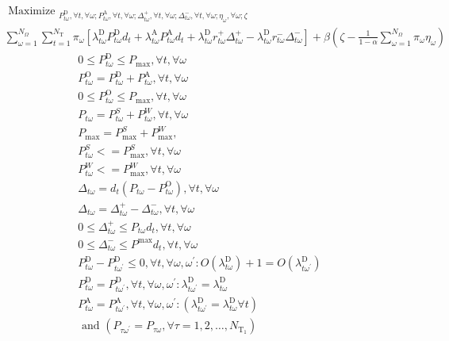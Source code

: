 \begin{equation*}
\begin{array}{c}
\text { Maximize }_{P_{t \omega}^{\mathrm{D}}, \forall t, \forall \omega ; P_{t \omega}^{\mathrm{A}}, \forall t, \forall \omega ; \Delta_{t \omega}^{+}, \forall t, \forall \omega ; \Delta_{t \omega}^{-}, \forall t, \forall \omega ; \eta_{\omega}, \forall \omega ; \zeta} \\
\sum_{\omega=1}^{N_{\Omega}} \sum_{t=1}^{N_{\mathrm{T}}} \pi_{\omega}\left[\lambda_{t \omega}^{\mathrm{D}} P_{t \omega}^{\mathrm{D}} d_{t}+\lambda_{t \omega}^{\mathrm{A}} P_{t \omega}^{\mathrm{A}} d_{t}+\lambda_{t \omega}^{\mathrm{D}} r_{t \omega}^{+} \Delta_{t \omega}^{+}-\lambda_{t \omega}^{\mathrm{D}} r_{t \omega}^{-} \Delta_{t \omega}^{-}\right] 
+\beta\left(\zeta-\frac{1}{1-\alpha} \sum_{\omega=1}^{N_{\Omega}} \pi_{\omega} \eta_{\omega}\right)
\end{array}
\end{equation*} 
\begin{equation*}
\begin{array}{c}
0 \leq P_{t \omega}^{\mathrm{D}} \leq P_{\mathrm{max}}, \forall t, \forall \omega \\
P_{t \omega}^{\mathrm{O}}=P_{t \omega}^{\mathrm{D}}+P_{t \omega}^{\mathrm{A}}, \forall t, \forall \omega \\
0 \leq P_{t \omega}^{\mathrm{O}} \leq P_{\max }, \forall t, \forall \omega \\
P_{t\omega}= P_{t\omega}^S+P_{t\omega}^W, \forall t,\forall \omega \\
P_{\max}= P^{S}_{\max}+P^{W}_{\max},  \\
P_{t\omega}^{S} <= P^{S}_{\max}, \forall t, \forall \omega \\
P_{t\omega}^{W} <= P^{W}_{\max}, \forall t, \forall \omega \\
\Delta_{t \omega}=d_{t}\left(P_{t \omega}-P_{t \omega}^{\mathrm{O}}\right), \forall t, \forall \omega \\
\Delta_{t \omega}=\Delta_{t \omega}^{+}-\Delta_{t \omega}^{-}, \forall t, \forall \omega \\
0 \leq \Delta_{t \omega}^{+} \leq P_{t \omega} d_{t}, \forall t, \forall \omega \\
0 \leq \Delta_{t \omega}^{-} \leq P^{\max } d_{t}, \forall t, \forall \omega \\
P_{t \omega}^{\mathrm{D}}-P_{t \omega^{\prime}}^{\mathrm{D}} \leq 0, \forall t, \forall \omega, \omega^{\prime}: O\left(\lambda_{t \omega}^{\mathrm{D}}\right)+1=O\left(\lambda_{t \omega^{\prime}}^{\mathrm{D}}\right) \\
P_{t \omega}^{\mathrm{D}}=P_{t \omega^{\prime}}^{\mathrm{D}}, \forall t, \forall \omega, \omega^{\prime}: \lambda_{t \omega^{\prime}}^{\mathrm{D}}=\lambda_{t \omega}^{\mathrm{D}} \\
P_{t \omega}^{\mathrm{A}}=P_{t \omega^{\prime}}^{\mathrm{A}}, \forall t, \forall \omega, \omega^{\prime}:\left(\lambda_{t \omega^{\prime}}^{\mathrm{D}}=\lambda_{t \omega}^{\mathrm{D}} \forall t\right) \\
\text { and }\left(P_{\tau \omega^{\prime}}=P_{\tau \omega}, \forall \tau=1,2, \ldots, N_{\mathrm{T}_{1}}\right)
\end{array}
\end{equation*}
